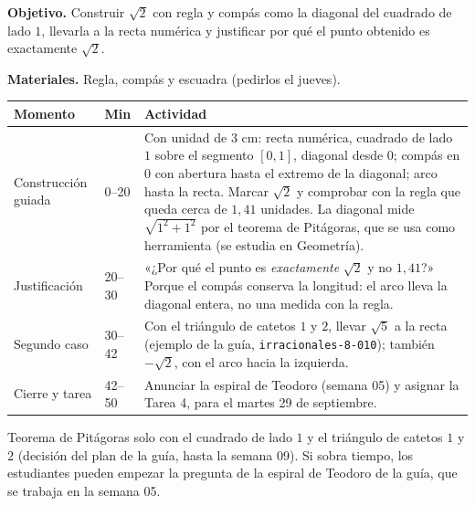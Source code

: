 \documentclass[11pt]{article}
\begin{document}
\textbf{Objetivo.} Construir $\sqrt{2}$ con regla y compás como la diagonal del cuadrado de
lado $1$, llevarla a la recta numérica y justificar por qué el punto obtenido es exactamente
$\sqrt{2}$.

\textbf{Materiales.} Regla, compás y escuadra (pedirlos el jueves).

\begin{center}
{\renewcommand{\arraystretch}{1.3}
\begin{tabularx}{\linewidth}{@{}l l X@{}}
  \toprule
  \textbf{Momento} & \textbf{Min} & \textbf{Actividad}\\
  \midrule
  Construcción guiada & 0–20 & Con unidad de $3$ cm: recta numérica, cuadrado de lado $1$
    sobre el segmento $[0,1]$, diagonal desde $0$; compás en $0$ con abertura hasta el
    extremo de la diagonal; arco hasta la recta. Marcar $\sqrt{2}$ y comprobar con la regla
    que queda cerca de $1{,}41$ unidades. La diagonal mide $\sqrt{1^2 + 1^2}$ por el teorema de
    Pitágoras, que se usa como herramienta (se estudia en Geometría).\\
  Justificación & 20–30 & «¿Por qué el punto es \emph{exactamente} $\sqrt{2}$ y no
    $1{,}41$?» Porque el compás conserva la longitud: el arco lleva la diagonal entera, no una
    medida con la regla.\\
  Segundo caso & 30–42 & Con el triángulo de catetos $1$ y $2$, llevar $\sqrt{5}$ a la recta
    (ejemplo de la guía, \texttt{irracionales-8-010}); también $-\sqrt{2}$, con el arco hacia la
    izquierda.\\
  Cierre y tarea & 42–50 & Anunciar la espiral de Teodoro (semana 05) y asignar la Tarea 4,
    para el martes 29 de septiembre.\\
  \bottomrule
\end{tabularx}}
\end{center}

\begin{nota}
Teorema de Pitágoras solo con el cuadrado de lado $1$ y el triángulo de catetos $1$ y $2$
(decisión del plan de la guía, hasta la semana 09). Si sobra tiempo, los estudiantes pueden
empezar la pregunta de la espiral de Teodoro de la guía, que se trabaja en la semana 05.
\end{nota}
\end{document}
